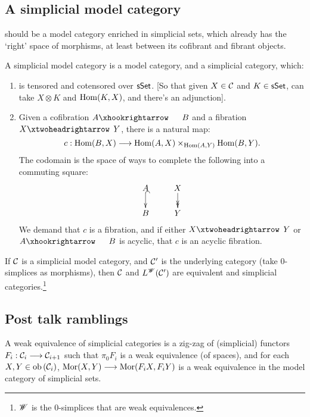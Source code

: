 \begin{SaulSimplicialLocalisation}
\subsection*{A simplicial model category}
should be a model category enriched in simplicial sets, which already has the `right' space of morphisms, at least between its cofibrant and fibrant objects.
\begin{defn*}
A simplicial model category is a model category, and a simplicial category, which: 
\begin{enumerate}
\item is tensored and cotensored over $\operatorname{{\mathsf{sSet}}}$. [So that given $X\in \mathcal{C}$ and $K\in\operatorname{{\mathsf{sSet}}}$, can take $X\otimes K$ and $\operatorname{Hom}(K,X)$, and there's an adjunction].
\item Given a cofibration $A\cofibration B$ and a fibration $X\fibration Y$, there is a natural map:
\[c:\operatorname{Hom}(B,X)\longrightarrow\operatorname{Hom}(A,X)\times_{\operatorname{Hom}(A,Y)}\operatorname{Hom}(B,Y).\]
The codomain is the space of ways to complete the following into a commuting square:
\[\xymatrix@R=.6cm{
A\ar@{^{(}->}[d]&X\ar@{->>}[d]\\
B&Y
}\]
We demand that $c$ is a fibration, and if either $X\fibration Y$ or $A\cofibration B$ is acyclic, that $c$ is an acyclic fibration.
\end{enumerate}
\begin{punchline}
If $\mathcal{C}$ is a simplicial model category, and $\mathcal{C}'$ is the underlying category (take $0$-simplices as morphisms), then $\mathcal{C}$ and $L^{\mathscr{W}}(\mathcal{C}')$ are equivalent and simplicial categories.\footnote{$\mathscr{W}$ is the $0$-simplices that are weak equivalences.}
\end{punchline}
\subsection*{Post talk ramblings}
A weak equivalence of simplicial categories is a zig-zag of (simplicial) functors $F_i:\mathcal{C}_i\longrightarrow\mathcal{C}_{i+1}$ such that $\pi_0F_i$ is a weak equivalence (of spaces), and for each $X,Y\in\textup{ob}\,(\mathcal{C}_i)$, $\operatorname{Mor}(X,Y)\longrightarrow\operatorname{Mor}(F_iX,F_iY)$ is a weak equivalence in the model category of simplicial sets.
\end{defn*}


\pagebreak
\end{SaulSimplicialLocalisation}
